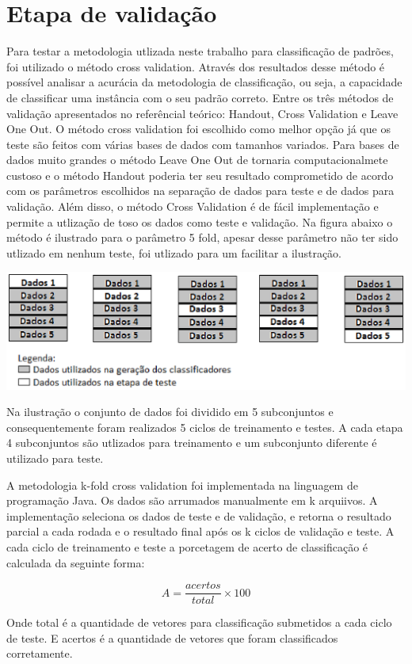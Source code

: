 \section{Etapa de validação}
Para testar a metodologia utlizada neste trabalho para classificação de padrões, foi utilizado o método cross validation. Através dos resultados desse método é possível analisar a acurácia da metodologia de classificação, ou seja, a capacidade de classificar uma instância com o seu padrão correto.
Entre os três métodos de validação apresentados no referêncial teórico: Handout, Cross Validation e Leave One Out. O método cross validation foi escolhido como melhor opção já que os teste são feitos com várias bases de dados com tamanhos variados. Para bases de dados muito grandes o método Leave One Out de tornaria computacionalmete custoso e o método Handout poderia ter seu resultado comprometido de acordo com os parâmetros escolhidos na separação de dados para teste e de dados para validação. Além disso, o método Cross Validation é de fácil implementação e permite a utlização de toso os dados como teste e validação.
Na figura abaixo o método é ilustrado para o parâmetro 5 fold, apesar desse parâmetro não ter sido utlizado em nenhum teste, foi utlizado para um facilitar a ilustração.
\begin{center}
	\includegraphics[scale=1.0]{graficos/cross_validation}
	\label{img:cross_validation}
\end{center}

Na ilustração o conjunto de dados foi dividido em 5 subconjuntos e consequentemente foram realizados 5 ciclos de treinamento e testes. A cada etapa 4 subconjuntos são utlizados para treinamento e um subconjunto diferente é utilizado para teste. 

A metodologia k-fold cross validation foi implementada na linguagem de programação Java. Os dados são arrumados manualmente em k arquiivos. A implementação seleciona os dados de teste e de validação, e retorna o resultado parcial a cada rodada e o resultado final após os k ciclos de validação e teste. A cada ciclo de treinamento e teste a porcetagem de acerto de classificação é calculada da seguinte forma:

$$A = \frac{acertos}{total}\times 100$$

Onde total é a quantidade de vetores para classificação submetidos a cada ciclo de teste. E acertos é a quantidade de vetores que foram classificados corretamente.



